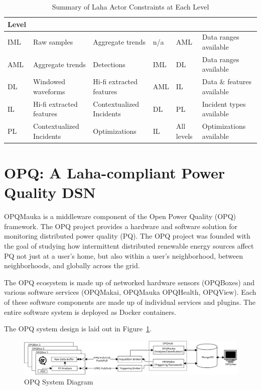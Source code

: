 \begin{table}[h]
	\centering
	\caption{Summary of Laha Actor Constraints at Each Level}
	\begin{tabularx}{\textwidth}{lXXllX}
		\toprule
		\textbf{Level} & \boldmath{$A_i$} & \boldmath{$Ao$} & \boldmath{$A_{ai}$} & \boldmath{$A_{ao}$} & \boldmath{$A_p$} \\
		\midrule
		IML & Raw samples & Aggregate trends & n/a & AML & Data ranges available \\
		AML & Aggregate trends & Detections & IML & DL & Data ranges available \\
		DL & Windowed waveforms & Hi-fi extracted features & AML & IL & Data \& features available \\
		IL & Hi-fi extracted features & Contextualized Incidents & DL & PL & Incident types available \\
		PL & Contextualized Incidents & Optimizations & IL & All levels & Optimizations available \\
		\bottomrule
	\end{tabularx}
	\label{actor-constraint-table}
\end{table}

\section{OPQ: A Laha-compliant Power Quality DSN}\label{sec:opq:-a-laha-compliant-power-quality-dsn}
OPQMauka is a middleware component of the Open Power Quality (OPQ) framework. The OPQ project provides a hardware and software solution for monitoring distributed power quality (PQ). The OPQ project was founded with the goal of studying how intermittent distributed renewable energy sources affect PQ not just at a user's home, but also within a user's neighborhood, between neighborhoods, and globally across the grid.

The OPQ ecosystem is made up of networked hardware sensors (OPQBoxes) and various software services (OPQMakai, OPQMauka OPQHealth, OPQView). Each of these software components are made up of individual services and plugins. The entire software system is deployed as Docker containers.

The OPQ system design is laid out in Figure~\ref{fig:opq-system}.

\begin{figure}
	\centering
	\includegraphics[width=\linewidth]{figures/system-diagram.png}
	\caption{OPQ System Diagram}\label{fig:opq-system}
\end{figure}


